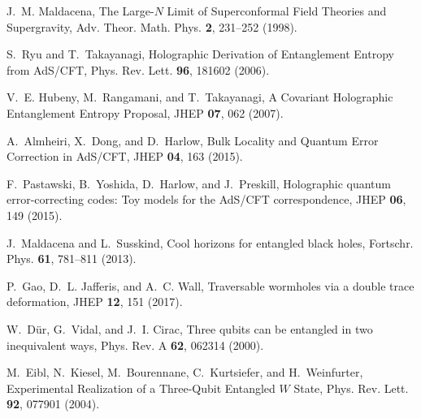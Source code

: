\documentclass[11pt]{article}
\begin{document}

\begin{thebibliography}{99}

J.~M. Maldacena,
\newblock The Large-$N$ Limit of Superconformal Field Theories and Supergravity,
\newblock Adv. Theor. Math. Phys. \textbf{2}, 231--252 (1998).

S.~Ryu and T.~Takayanagi,
\newblock Holographic Derivation of Entanglement Entropy from AdS/CFT,
\newblock Phys. Rev. Lett. \textbf{96}, 181602 (2006).

V.~E. Hubeny, M.~Rangamani, and T.~Takayanagi,
\newblock A Covariant Holographic Entanglement Entropy Proposal,
\newblock JHEP \textbf{07}, 062 (2007).

A.~Almheiri, X.~Dong, and D.~Harlow,
\newblock Bulk Locality and Quantum Error Correction in AdS/CFT,
\newblock JHEP \textbf{04}, 163 (2015).

F.~Pastawski, B.~Yoshida, D.~Harlow, and J.~Preskill,
\newblock Holographic quantum error-correcting codes: Toy models for the AdS/CFT correspondence,
\newblock JHEP \textbf{06}, 149 (2015).

J.~Maldacena and L.~Susskind,
\newblock Cool horizons for entangled black holes,
\newblock Fortschr. Phys. \textbf{61}, 781--811 (2013).

P.~Gao, D.~L. Jafferis, and A.~C. Wall,
\newblock Traversable wormholes via a double trace deformation,
\newblock JHEP \textbf{12}, 151 (2017).

W.~D\"ur, G.~Vidal, and J.~I. Cirac,
\newblock Three qubits can be entangled in two inequivalent ways,
\newblock Phys. Rev. A \textbf{62}, 062314 (2000).

M.~Eibl, N.~Kiesel, M.~Bourennane, C.~Kurtsiefer, and H.~Weinfurter,
\newblock Experimental Realization of a Three-Qubit Entangled $W$ State,
\newblock Phys. Rev. Lett. \textbf{92}, 077901 (2004).

\end{thebibliography}
\end{document}
